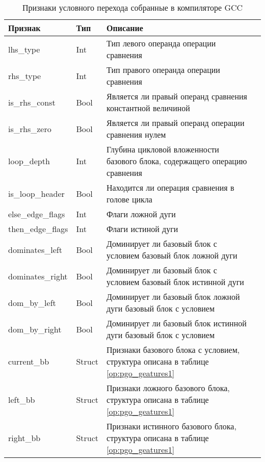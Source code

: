\begin{table} [htbp]
	\centering
	\begin{threeparttable}%
		\caption{Признаки условного перехода собранные в компиляторе GCC}\label{op:pgo_geatures2}%
		\begin{tabular}{| m{4cm} | m{2cm} |  m{9cm}l |}
		\hline
			\hline
			\centering \textbf{Признак}			 & \centering  \textbf{Тип} &  \centering  \textbf{Описание} & \\
			\hline
			\centering lhs\_type			 & \centering  Int &   Тип левого операнда операции сравнения & \\
			\hline
			\centering rhs\_type			 & \centering  Int &    Тип правого операнда операции сравнения & \\
			\hline
			\centering is\_rhs\_const			 & \centering  Bool &    Является ли правый операнд сравнения константной величиной & \\
			\hline
			\centering is\_rhs\_zero			 & \centering  Bool &    Является ли правый операнд операции сравнения нулем & \\
			\hline
			\centering loop\_depth			 & \centering  Int &    Глубина цикловой вложенности базового блока, содержащего операцию сравнения & \\
			\hline
			\centering is\_loop\_header			 & \centering  Bool &    Находится ли операция сравнения в голове цикла  & \\
			\hline
			\centering else\_edge\_flags			 & \centering  Int &    Флаги ложной дуги & \\
			\hline
			\centering then\_edge\_flags			 & \centering  Int &    Флаги истиной дуги & \\
			\hline
			\centering dominates\_left			 & \centering  Bool &    Доминирует ли базовый блок с условием  базовый блок ложной дуги   & \\	
			\hline
			\centering dominates\_right			 & \centering  Bool &    Доминирует ли базовый блок с условием  базовый блок истинной дуги  & \\	
			\hline
			\centering dom\_by\_left			 & \centering  Bool &    Доминирует ли базовый блок ложной дуги базовый блок с условием  & \\	
			\hline
			\centering dom\_by\_right			 & \centering  Bool &    Доминирует ли базовый блок истинной дуги базовый блок с условием  & \\	
			\hline
			\centering current\_bb			 & \centering  Struct &    Признаки базового блока с условием, структура описана в таблице \ref{op:pgo_geatures1}  & \\	
			\hline
			\centering left\_bb			 & \centering  Struct &     Признаки ложного базового блока, структура описана в таблице \ref{op:pgo_geatures1} & \\	
			\hline
			\centering right\_bb			 & \centering  Struct &    Признаки истинного базового блока, структура описана в таблице \ref{op:pgo_geatures1} & \\	
			\hline
			\hline
		\end{tabular}
	\end{threeparttable}
\end{table}
